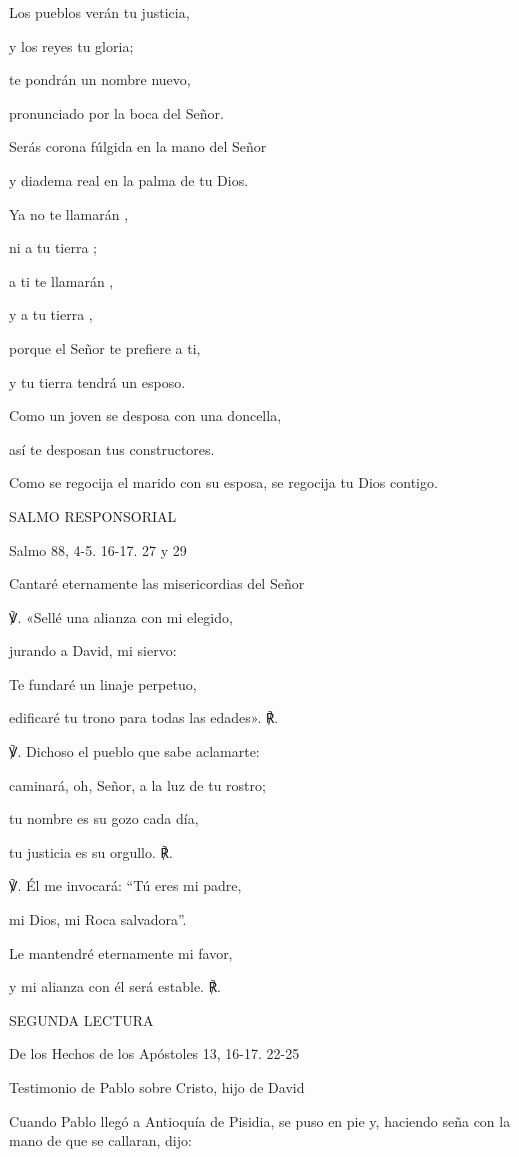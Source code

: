 Los pueblos verán tu justicia,

y los reyes tu gloria;

te pondrán un nombre nuevo,

pronunciado por la boca del Señor.

Serás corona fúlgida en la mano del Señor

y diadema real en la palma de tu Dios.

Ya no te llamarán ,

ni a tu tierra ;

a ti te llamarán ,

y a tu tierra ,

porque el Señor te prefiere a ti,

y tu tierra tendrá un esposo.

Como un joven se desposa con una doncella,

así te desposan tus constructores.

Como se regocija el marido con su esposa, se regocija tu Dios contigo.

SALMO RESPONSORIAL

Salmo 88, 4-5. 16-17. 27 y 29

Cantaré eternamente las misericordias del Señor

℣. «Sellé una alianza con mi elegido,

jurando a David, mi siervo:

Te fundaré un linaje perpetuo,

edificaré tu trono para todas las edades». ℟.

℣. Dichoso el pueblo que sabe aclamarte:

caminará, oh, Señor, a la luz de tu rostro;

tu nombre es su gozo cada día,

tu justicia es su orgullo. ℟.

℣. Él me invocará: ``Tú eres mi padre,

mi Dios, mi Roca salvadora''.

Le mantendré eternamente mi favor,

y mi alianza con él será estable. ℟.

SEGUNDA LECTURA

De los Hechos de los Apóstoles 13, 16-17. 22-25

Testimonio de Pablo sobre Cristo, hijo de David

Cuando Pablo llegó a Antioquía de Pisidia, se puso en pie y, haciendo
seña con la mano de que se callaran, dijo:

